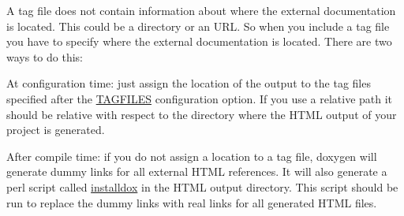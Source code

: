 A tag file does not contain information about where the external documentation is located. This could be a directory or an URL. So when you include a tag file you have to specify where the external documentation is located. There are two ways to do this: 
\begin{DoxyDescription}
\item[At configuration time:]just assign the location of the output to the tag files specified after the \hyperlink{config_cfg_tagfiles}{TAGFILES} configuration option. If you use a relative path it should be relative with respect to the directory where the HTML output of your project is generated. 
\item[After compile time:]if you do not assign a location to a tag file, doxygen will generate dummy links for all external HTML references. It will also generate a perl script called \hyperlink{installdox_usage}{installdox} in the HTML output directory. This script should be run to replace the dummy links with real links for all generated HTML files. 
\end{DoxyDescription}

